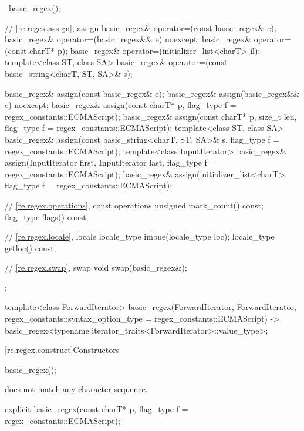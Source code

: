 \begin{codeblock}
{{    ~basic_regex();

    // \ref{re.regex.assign}, assign
    basic_regex& operator=(const basic_regex& e);
    basic_regex& operator=(basic_regex&& e) noexcept;
    basic_regex& operator=(const charT* p);
    basic_regex& operator=(initializer_list<charT> il);
    template<class ST, class SA>
      basic_regex& operator=(const basic_string<charT, ST, SA>& s);

    basic_regex& assign(const basic_regex& e);
    basic_regex& assign(basic_regex&& e) noexcept;
    basic_regex& assign(const charT* p, flag_type f = regex_constants::ECMAScript);
    basic_regex& assign(const charT* p, size_t len, flag_type f = regex_constants::ECMAScript);
    template<class ST, class SA>
      basic_regex& assign(const basic_string<charT, ST, SA>& s,
                          flag_type f = regex_constants::ECMAScript);
    template<class InputIterator>
      basic_regex& assign(InputIterator first, InputIterator last,
                          flag_type f = regex_constants::ECMAScript);
    basic_regex& assign(initializer_list<charT>,
                        flag_type f = regex_constants::ECMAScript);

    // \ref{re.regex.operations}, const operations
    unsigned mark_count() const;
    flag_type flags() const;

    // \ref{re.regex.locale}, locale
    locale_type imbue(locale_type loc);
    locale_type getloc() const;

    // \ref{re.regex.swap}, swap
    void swap(basic_regex&);
  };

  template<class ForwardIterator>
    basic_regex(ForwardIterator, ForwardIterator,
                regex_constants::syntax_option_type = regex_constants::ECMAScript)
      -> basic_regex<typename iterator_traits<ForwardIterator>::value_type>;
}
\end{codeblock}

[re.regex.construct]{Constructors}

%
\begin{itemdecl}
basic_regex();
\end{itemdecl}

\begin{itemdescr}
\pnum
\ensures
{} does not match any character sequence.
\end{itemdescr}

%
\begin{itemdecl}
explicit basic_regex(const charT* p, flag_type f = regex_constants::ECMAScript);
\end{itemdecl}

